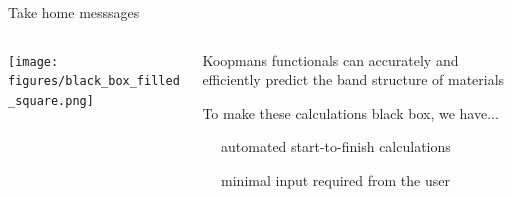 \documentclass[xcolor=table,aspectratio=169]{beamer}
\numberwithin{equation}{section}
\begin{document}
\begin{frame}{Take home messsages}

   \begin{columns}
      \begin{column}{0.5\textwidth}
         \texttt{[image: figures/black\_box\_filled\_square.png]}
      \end{column}
      \begin{column}{0.5\textwidth}

         Koopmans functionals can accurately and efficiently predict the band structure of materials

         \vspace{1ex}
         To make these calculations black box, we have...

         \vspace{1ex}
         \ %
         \ automated start-to-finish calculations 

         \vspace{1ex}
         \ %
         \ minimal input required from the user 
      \end{column}
   \end{columns}
\end{frame}
\end{document}
